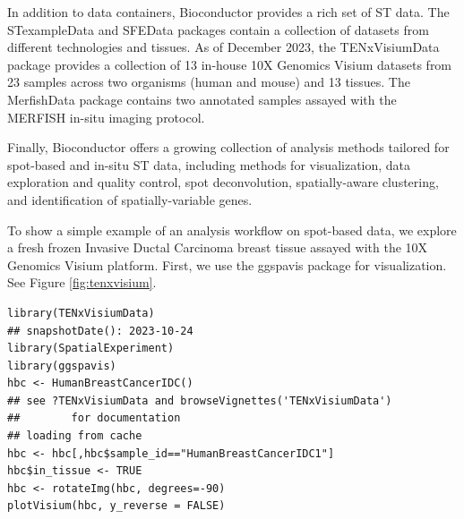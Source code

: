 \documentclass[graybox]{svmult}
\begin{document}
In addition to data containers, Bioconductor provides a rich set of ST data.
The STexampleData and SFEData packages contain a collection of datasets from
different technologies and tissues.
As of December 2023,
the TENxVisiumData package provides a collection of 13 in-house 10X Genomics
Visium datasets from 23 samples across two organisms (human and mouse) and 13
tissues.
The MerfishData package contains two annotated samples assayed with the MERFISH
in-situ imaging protocol.

Finally, Bioconductor offers a growing collection of analysis methods tailored
for spot-based and in-situ ST data, including methods for visualization,
data exploration and quality control, spot deconvolution,
spatially-aware clustering, and identification of spatially-variable genes.

To show a simple example of an analysis workflow on spot-based data,
we explore a fresh frozen
Invasive Ductal Carcinoma breast tissue assayed
with the 10X Genomics Visium platform.
First, we use the ggspavis package for visualization.
See Figure \ref{fig:tenxvisium}.


\begin{shaded}
\begin{verbatim}
library(TENxVisiumData)
## snapshotDate(): 2023-10-24
library(SpatialExperiment)
library(ggspavis)
hbc <- HumanBreastCancerIDC()
## see ?TENxVisiumData and browseVignettes('TENxVisiumData') 
##        for documentation
## loading from cache
hbc <- hbc[,hbc$sample_id=="HumanBreastCancerIDC1"]
hbc$in_tissue <- TRUE
hbc <- rotateImg(hbc, degrees=-90)
plotVisium(hbc, y_reverse = FALSE)
\end{verbatim}
\end{shaded}
\end{document}
